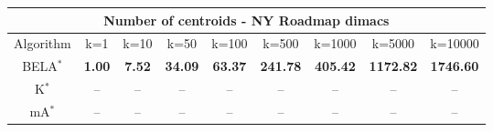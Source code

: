 \begin{tabular}{c|cccccccc}\toprule
\multicolumn{9}{c}{Number of centroids - NY Roadmap dimacs}\\ \midrule
Algorithm & k=1 & k=10 & k=50 & k=100 & k=500 & k=1000 & k=5000 & k=10000 \\ \midrule
BELA$^*$ & \textbf{1.00} & \textbf{7.52} & \textbf{34.09} & \textbf{63.37} & \textbf{241.78} & \textbf{405.42} & \textbf{1172.82} & \textbf{1746.60} \\
K$^*$ & -- & -- & -- & -- & -- & -- & -- & -- \\
mA$^*$ & -- & -- & -- & -- & -- & -- & -- & -- \\ \bottomrule 
\end{tabular}

